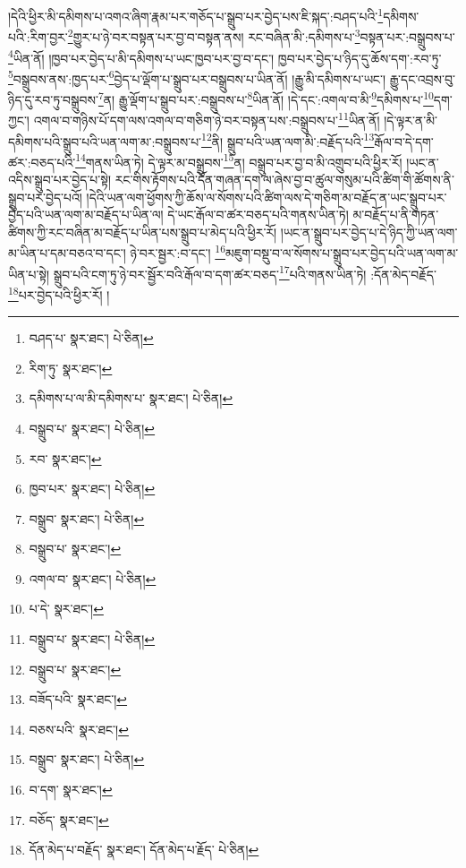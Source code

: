 །དེའི་ཕྱིར་མི་དམིགས་པ་འགའ་ཞིག་རྣམ་པར་གཅོད་པ་སྒྲུབ་པར་བྱེད་པས་ཇི་སྐད་:བཤད་པའི་\footnote{བཤད་པ་  སྣར་ཐང་།  པེ་ཅིན། }དམིགས་པའི་:རིག་བྱར་\footnote{རིག་ཏུ་  སྣར་ཐང་། }གྱུར་པ་ཉེ་བར་བསྟན་པར་བྱ་བ་བསྟན་ནས། རང་བཞིན་མི་:དམིགས་པ་\footnote{དམིགས་པ་ལ་མི་དམིགས་པ་  སྣར་ཐང་།  པེ་ཅིན། }བསྟན་པར་:བསྒྲུབས་པ་\footnote{བསྒྲུབ་པ་  སྣར་ཐང་།  པེ་ཅིན། }ཡིན་ནོ། །ཁྱབ་པར་བྱེད་པ་མི་དམིགས་པ་ཡང་ཁྱབ་པར་བྱ་བ་དང་། ཁྱབ་པར་བྱེད་པ་ཉིད་དུ་ཆོས་དག་:རབ་ཏུ་\footnote{རབ་  སྣར་ཐང་། }བསྒྲུབས་ནས་:ཁྱད་པར་\footnote{ཁྱབ་པར་  སྣར་ཐང་།  པེ་ཅིན། }བྱེད་པ་ལྡོག་པ་སྒྲུབ་པར་བསྒྲུབས་པ་ཡིན་ནོ། །རྒྱུ་མི་དམིགས་པ་ཡང་། རྒྱུ་དང་འབྲས་བུ་ཉིད་དུ་རབ་ཏུ་བསྒྲུབས་\footnote{བསྒྲུབ་  སྣར་ཐང་།  པེ་ཅིན། }ན། རྒྱུ་ལྡོག་པ་སྒྲུབ་པར་:བསྒྲུབས་པ་\footnote{བསྒྲུབ་པ་  སྣར་ཐང་། }ཡིན་ནོ། །དེ་དང་:འགལ་བ་མི་\footnote{འགལ་བ་  སྣར་ཐང་།  པེ་ཅིན། }དམིགས་པ་\footnote{པ་དེ་  སྣར་ཐང་། }དག་ཀྱང་། འགལ་བ་གཉིས་པོ་དག་ལས་འགལ་བ་གཅིག་ཉེ་བར་བསྟན་པས་:བསྒྲུབས་པ་\footnote{བསྒྲུབ་པ་  སྣར་ཐང་།  པེ་ཅིན། }ཡིན་ནོ། །དེ་ལྟར་ན་མི་དམིགས་པའི་སྒྲུབ་པའི་ཡན་ལག་མ་:བསྒྲུབས་པ་\footnote{བསྒྲུབ་པ་  སྣར་ཐང་། }ནི། སྒྲུབ་པའི་ཡན་ལག་མི་:བརྗོད་པའི་\footnote{བཟོད་པའི་  སྣར་ཐང་། }རྒོལ་བ་དེ་དག་ཚར་:བཅད་པའི་\footnote{བཅས་པའི་  སྣར་ཐང་། }གནས་ཡིན་ཏེ། དེ་ལྟར་མ་བསྒྲུབས་\footnote{བསྒྲུབ་  སྣར་ཐང་།  པེ་ཅིན། }ན། བསྒྲུབ་པར་བྱ་བ་མི་འགྲུབ་པའི་ཕྱིར་རོ། །ཡང་ན་འདིས་སྒྲུབ་པར་བྱེད་པ་སྟེ། རང་གིས་རྟོགས་པའི་དོན་གཞན་དག་ལ་ཞེས་བྱ་བ་ཚུལ་གསུམ་པའི་ཚིག་གི་ཚོགས་ནི་སྒྲུབ་པར་བྱེད་པའོ། །དེའི་ཡན་ལག་ཕྱོགས་ཀྱི་ཆོས་ལ་སོགས་པའི་ཚིག་ལས་དེ་གཅིག་མ་བརྗོད་ན་ཡང་སྒྲུབ་པར་བྱེད་པའི་ཡན་ལག་མ་བརྗོད་པ་ཡིན་ལ། དེ་ཡང་རྒོལ་བ་ཚར་བཅད་པའི་གནས་ཡིན་ཏེ། མ་བརྗོད་པ་ནི་གཏན་ཚིགས་ཀྱི་རང་བཞིན་མ་བརྗོད་པ་ཡིན་པས་སྒྲུབ་པ་མེད་པའི་ཕྱིར་རོ། །ཡང་ན་སྒྲུབ་པར་བྱེད་པ་དེ་ཉིད་ཀྱི་ཡན་ལག་མ་ཡིན་པ་དམ་བཅའ་བ་དང་། ཉེ་བར་སྦྱར་:བ་དང་། \footnote{བ་དག་  སྣར་ཐང་། }མཇུག་བསྡུ་བ་ལ་སོགས་པ་སྒྲུབ་པར་བྱེད་པའི་ཡན་ལག་མ་ཡིན་པ་སྟེ། སྒྲུབ་པའི་ངག་ཏུ་ཉེ་བར་སྦྱོར་བའི་རྒོལ་བ་དག་ཚར་བཅད་\footnote{བཅོད་  སྣར་ཐང་། }པའི་གནས་ཡིན་ཏེ། :དོན་མེད་བརྗོད་\footnote{དོན་མེད་པ་བརྗོད་  སྣར་ཐང་། དོན་མེད་པ་རྗོད་  པེ་ཅིན། }པར་བྱེད་པའི་ཕྱིར་རོ། །
